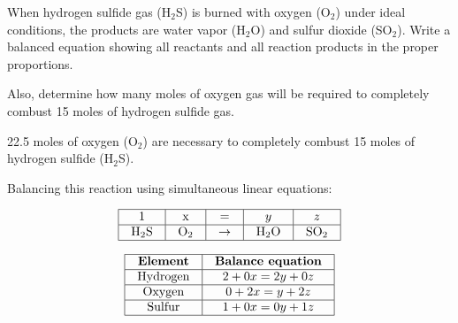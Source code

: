 

When hydrogen sulfide gas (H$_{2}$S) is burned with oxygen (O$_{2}$) under ideal conditions, the products are water vapor (H$_{2}$O) and sulfur dioxide (SO$_{2}$).  Write a balanced equation showing all reactants and all reaction products in the proper proportions.

\vskip 10pt

Also, determine how many moles of oxygen gas will be required to completely combust 15 moles of hydrogen sulfide gas.

\vskip 10pt







22.5 moles of oxygen (O$_{2}$) are necessary to completely combust 15 moles of hydrogen sulfide (H$_{2}$S).







Balancing this reaction using simultaneous linear equations:


$$\vbox{\offinterlineskip
\halign{\strut
\vrule \quad\hfil # \ \hfil & 
\vrule \quad\hfil # \ \hfil & 
\vrule \quad\hfil # \ \hfil & 
\vrule \quad\hfil # \ \hfil & 
\vrule \quad\hfil # \ \hfil \vrule \cr
\noalign{\hrule}
%
1 & x & = & $y$ & $z$ \cr
%
\noalign{\hrule}
%
H$_{2}$S & O$_{2}$ & $\to$ & H$_{2}$O & SO$_{2}$ \cr
%
\noalign{\hrule}
} %
}$$ %


$$\vbox{\offinterlineskip
\halign{\strut
\vrule \quad\hfil # \ \hfil & 
\vrule \quad\hfil # \ \hfil \vrule \cr
\noalign{\hrule}
%
{\bf Element} & {\bf Balance equation} \cr
%
\noalign{\hrule}
%
Hydrogen & $2 + 0x = 2y + 0z$ \cr
%
\noalign{\hrule}
%
Oxygen & $0 + 2x = y + 2z$ \cr
%
\noalign{\hrule}
%
Sulfur & $1 + 0x = 0y + 1z$ \cr
%
\noalign{\hrule}
} %
}$$ %

